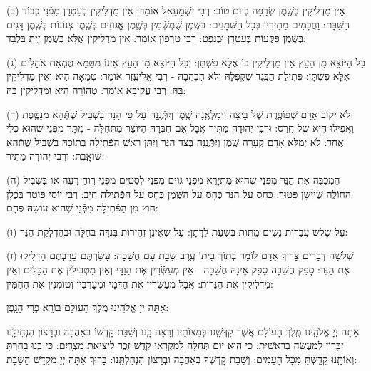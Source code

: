\documentclass[twoside, openany, parskip=half, 11pt]{book}
\begin{document}
(ב) אֵין מַדְלִיקִין בְּשֶֽׁמֶן שְׂרֵפָה בְּיוֹם טוֹב: רְבִי יִשְׁמָעֵאל אוֹמֵר: אֵין מַדְלִיקִין בְּעִטְרָן מִפְּֿנֵי כְּבוֹד הַשַּׁבָּת: וַחֲכָמִים מַתִּירִין בְּכָל הַשְּׁמָנִים: בְּשֶֽׁמֶן שֻׁמְשְֿׁמִין בְּשֶֽׁמֶן אֱגוֹזִים בְּשֶֽׁמֶן צְנוֹנוֹת בְּשֶֽׁמֶן דָּגִים בְּשֶֽׁמֶן פַּקֻּעוֹת בְּעִטְרָן וּבְנֵפְטְ: רְבִי טַרְפוֹן אוֹמֵר: אֵין מַדְלִיקִין אֶלָּא בְּשֶֽׁמֶן זַֽיִת בִּלְבָד: 

(ג) כָּל הַיּוֹצֵא מִן הָעֵץ אֵין מַדְלִיקִין בּוֹ אֶלָּא פִשְׁתָּן: וְכָל הַיּוֹצֵא מִן הָעֵץ אֵינוֹ מִטַּמֵּא טֻמְאַת אֹהָלִים אֶלָּא פִשְׁתָּן: פְּתִילַת הַבֶּֽגֶד שֶׁקִּפְּֿלָהּ וְלֹא הִבְהֲבָהּ - רְבִי אֱלִיעֶֽזֶר אוֹמֵר: טְמֵאָה הִיא וְאֵין מַדְלִיקִין בָּהּ: רְבִי עֲקִיבָא אוֹמֵר: טְהוֹרָה הִיא וּמַדְלִיקִין בָּהּ: 

 (ד) לֹא יִקּוֹב אָדָם שְׁפוֹפֶֽרֶת שֶׁל בֵּיצָה וִימַלְּאֶֽנָּה שֶֽׁמֶן וְיִתְּֿנֶֽנָּה עַל פִּי הַנֵּר בִּשְׁבִיל שֶׁתְּֿהֵא מְנַטֶּֽפֶת וַאֲפִילוּ הִיא שֶׁל חֶֽרֶס: וּרְבִי יְהוּדָה מַתִּיר אֲבָל אִם חִבְּֿרָהּ הַיּוֹצֵר מִתְּֿחִלָּה - מֻתָּר מִפְּֿנֵי שֶׁהוּא כְּלִי אֶחָד: לֹא יְמַלֵּא אָדָם קְעָרָה שֶֽׁמֶן וְיִתְּֿנֶֽנָּה בְּצַד הַנֵּר וְיִתֵּן רֹאשׁ הַפְּֿתִילָה בְּתוֹכָהּ בִּשְׁבִיל שֶׁתְּֿהֵא שׁוֹאָֽבֶת: וּרְבִי יְהוּדָה מַתִּיר:
 
(ה) הַמְֿכַבֶּה אֶת הַנֵּר מִפְּֿנֵי שֶׁהוּא מִתְיָרֵא מִפְּֿנֵי גוֹיִם מִפְּֿנֵי לִסְטִים מִפְּֿנֵי רֽוּחַ רָעָה אוֹ בִּשְׁבִיל הַחוֹלֶה שֶׁיִּישָׁן פָּטוּר: כְּחָס עַל הַנֵּר כְּחָס עַל הַשֶּֽׁמֶן כְּחָס עַל הַפְּֿתִילָה חַיָּב: רְבִי יוֹסֵי פּוֹטֵר בְּכֻלָּן חוּץ מִן הַפְּֿתִילָה מִפְּֿנֵי שֶׁהוּא עוֹשָׂהּ פֶּחָם:

(ו) עַל שָׁלֹשׁ עֲבֵרוֹת נָשִׁים מֵתוֹת בִּשְׁעַת לֵדָתָן: עַל שֶׁאֵינָן זְהִירוֹת בְּנִדָּה בְּחַלָּה וּבְהַדְלָקַת הַנֵּר:

(ז) שְׁלֹשָׁה דְבָרִים צָרִיךְ אָדָם לוֹמַר בְּתוֹךְ בֵּיתוֹ עֶֽרֶב שַׁבָּת עִם חֲשֵׁכָה: עִשַׂרְתֶּם עֵרַבְתֶּם הַדְלִֽיקוּ אֶת הַנֵּר: סָפֵק חֲשֵׁכָה סָפֵק אֵינָהּ חֲשֵׁכָה - אֵין מְעַשְּֿׂרִין אֶת הַוַּדָּי וְאֵין מַטְבִּילִין אֶת הַכֵּלִים וְאֵין מַדְלִיקִין אֶת הַנֵּרוֹת: אֲבָל מְעַשְּֿׂרִין אֶת הַדְּֿמָי וּמְעָרְֿבִין וְטוֹמְֿנִין אֶת הַחַמִּין:



 אַתָּה יְיָ אֱלֹהֵֽינוּ מֶֽלֶךְ הָעוֹלָם בּוֹרֵא פְּרִי הַגָּֽפֶן:

 אַתָּה יְיָ אֱלֹהֵֽינוּ מֶֽלֶךְ הָעוֹלָם אֲשֶׁר קִדְּשָֽׁנוּ בְּמִצְוֹתָיו וְרָֽצָה בָֽנוּ וְשַׁבַּת קָדְשׁוֹ בְּאַהֲבָה וּבְרָצוֹן הִנְחִילָֽנוּ זִכָּרוֹן לְמַעֲשֵׂה בְרֵאשִׁית: כִּי הוּא יוֹם תְּחִלָּה לְמִקְרָאֵי קֹֽדֶשׁ זֵֽכֶר לִיצִיאַת מִצְרָֽיִם: כִּי בָֽנוּ בָחַֽרְתָּ וְאוֹתָֽנוּ קִדַּֽשְׁתָּ מִכָּל הָעַמִּים: וְשַׁבַּת קָדְשְׁךָ בְּאַהֲבָה וּבְרָצוֹן הִנְחַלְתָּֽנוּ: בָּרוּךְ אַתָּה יְיָ מְקַדֵּשׁ הַשַּׁבָּת:
\end{document}
